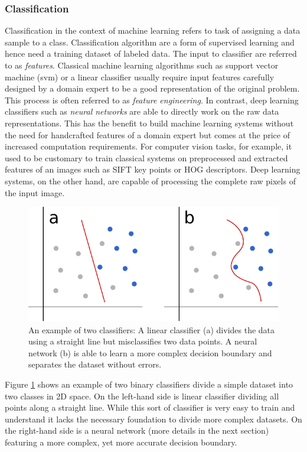 \subsubsection{Classification}
Classification in the context of machine learning refers to task of assigning a data sample to a class. Classification algorithm are a form of supervised learning and hence need a training dataset of labeled data. The input to classifier are referred to as \textit{features}. Classical machine learning algorithms such as support vector machine (\ac{svm}) or a linear classifier usually require input features carefully designed by a domain expert to be a good representation of the original problem. This process is often referred to as \textit{feature engineering}. In contrast, deep learning classifiers such as \textit{neural networks} are able to directly work on the raw data representations. This has the benefit to build machine learning systems without the need for handcrafted features of a domain expert but comes at the price of increased computation requirements. For computer vision tasks, for example, it used to be customary to train classical systems on preprocessed and extracted features of an images such as SIFT key points\cite{lowe1999object} or HOG descriptors\cite{dalal2005histograms}. Deep learning systems, on the other hand, are capable of processing the complete raw pixels of the input image.

	\begin{figure}[]
  		\centering
    	\includegraphics[width=\textwidth, keepaspectratio]{img/classifiers.pdf}
    	\caption{An example of two classifiers: A linear classifier (a) divides the data using a straight line but misclassifies two data points. A neural network (b) is able to learn a more complex decision boundary and separates the dataset without errors.}
    	\label{fig:classifiers}
	\end{figure}

Figure \ref{fig:classifiers} shows an example of two binary classifiers divide a simple dataset into two classes in 2D space. On the left-hand side is linear classifier dividing all points along a straight line. While this sort of classifier is very easy to train and understand it lacks the necessary foundation to divide more complex datasets. On the right-hand side is a neural network (more details in the next section) featuring a more complex, yet more accurate decision boundary. 

